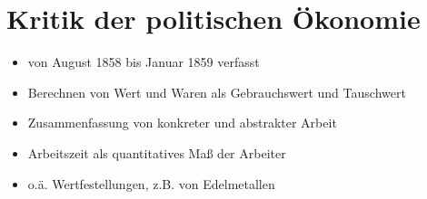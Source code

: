 \documentclass[10pt,a4paper, ngerman]{beamer}
\begin{document}
\section{Kritik der politischen Ökonomie}
\begin{frame}
  \begin{itemize}
    \item von August 1858 bis Januar 1859 verfasst
    \pause
    \item Berechnen von Wert und Waren als Gebrauchswert und Tauschwert
    \pause
    \item Zusammenfassung von konkreter und abstrakter Arbeit
    \pause
    \item Arbeitszeit als quantitatives Maß der Arbeiter
    \pause
    \item o.ä. Wertfestellungen, z.B. von Edelmetallen
  \end{itemize}
\end{frame}

\begin{frame}
\titlepage
\end{frame}
\end{document}
